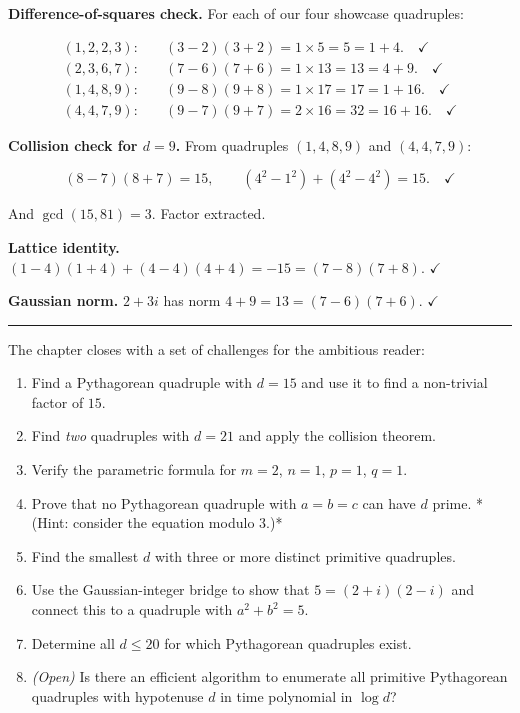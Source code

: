 \documentclass[11pt,openany]{book}
\theoremstyle{definition}
\theoremstyle{plain}
\theoremstyle{remark}
\begin{document}
\textbf{Difference-of-squares check.} For each of our four showcase quadruples:

$$\begin{aligned}
(1,2,2,3): &\quad (3-2)(3+2) = 1 \times 5 = 5 = 1 + 4. \quad \checkmark \\
(2,3,6,7): &\quad (7-6)(7+6) = 1 \times 13 = 13 = 4 + 9. \quad \checkmark \\
(1,4,8,9): &\quad (9-8)(9+8) = 1 \times 17 = 17 = 1 + 16. \quad \checkmark \\
(4,4,7,9): &\quad (9-7)(9+7) = 2 \times 16 = 32 = 16 + 16. \quad \checkmark
\end{aligned}$$

\textbf{Collision check for $d = 9$.} From quadruples $(1,4,8,9)$ and $(4,4,7,9)$:

$$(8-7)(8+7) = 15, \qquad (4^2 - 1^2) + (4^2 - 4^2) = 15. \quad \checkmark$$

And $\gcd(15, 81) = 3$. Factor extracted.

\textbf{Lattice identity.} $(1-4)(1+4) + (4-4)(4+4) = -15 = (7-8)(7+8)$. $\checkmark$

\textbf{Gaussian norm.} $2 + 3i$ has norm $4 + 9 = 13 = (7-6)(7+6)$. $\checkmark$

\bigskip\noindent\rule{\textwidth}{0.4pt}\bigskip


The chapter closes with a set of challenges for the ambitious reader:

\begin{enumerate}
\item Find a Pythagorean quadruple with $d = 15$ and use it to find a non-trivial factor of $15$.
\item Find \textit{two} quadruples with $d = 21$ and apply the collision theorem.
\item Verify the parametric formula for $m = 2$, $n = 1$, $p = 1$, $q = 1$.
\item Prove that no Pythagorean quadruple with $a = b = c$ can have $d$ prime. *(Hint: consider the equation modulo $3$.)*
\item Find the smallest $d$ with three or more distinct primitive quadruples.
\item Use the Gaussian-integer bridge to show that $5 = (2 + i)(2 - i)$ and connect this to a quadruple with $a^2 + b^2 = 5$.
\item Determine all $d \le 20$ for which Pythagorean quadruples exist.
\item \textit{(Open)} Is there an efficient algorithm to enumerate all primitive Pythagorean quadruples with hypotenuse $d$ in time polynomial in $\log d$?
\end{enumerate}
\end{document}

